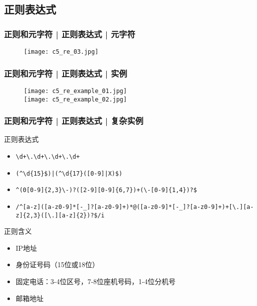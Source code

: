 \subsection{正则表达式}
\begin{frame}
  \frametitle{正则和元字符 | 正则表达式 | 元字符}
  \begin{figure}
    \centering
    \texttt{[image: c5\_re\_03.jpg]}
  \end{figure}
\end{frame}

\begin{frame}
  \frametitle{正则和元字符 | 正则表达式 | \alert{实例}}
  \begin{figure}
    \centering
    \texttt{[image: c5\_re\_example\_01.jpg]}\\
    \texttt{[image: c5\_re\_example\_02.jpg]}
  \end{figure}
\end{frame}

\begin{frame}[fragile]
  \frametitle{正则和元字符 | 正则表达式 | 复杂实例}
  \begin{block}{正则表达式}
    \begin{itemize}
      \item<2-> \verb|\d+\.\d+\.\d+\.\d+|
      \item<4-> \verb=(^\d{15}$)|(^\d{17}([0-9]|X)$)=
      \item<6-> \verb|^(0[0-9]{2,3}\-)?([2-9][0-9]{6,7})+(\-[0-9]{1,4})?$|
      \item<8-> \verb|/^[a-z]([a-z0-9]*[-_]?[a-z0-9]+)*@([a-z0-9]*[-_]?[a-z0-9]+)+[\.][a-z]{2,3}([\.][a-z]{2})?$/i|
    \end{itemize}
  \end{block}
  \begin{block}{正则含义}
    \begin{itemize}
      \item<3-> IP地址
      \item<5-> 身份证号码（15位或18位）
      \item<7-> 固定电话：3-4位区号，7-8位座机号码，1-4位分机号
      \item<9-> 邮箱地址
    \end{itemize}
  \end{block}
\end{frame}


